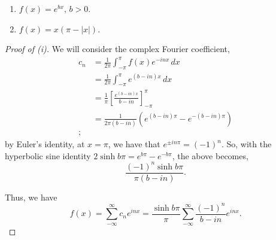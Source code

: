 \documentclass[../hw5]{subfiles}
\begin{document}
\begin{problem}
\begin{enumerate}
	\item $f(x)=e^{bx},\, b>0$.
	\item  $f(x)=x(\pi- |x|)$.
\end{enumerate}
\end{problem}
\begin{proof}[Proof of (i)]
	We will consider the complex Fourier coefficient,
	\begin{align*}
		c_n & = \frac{1}{2\pi }\int_{-\pi }^{\pi } f(x)e^{-inx} \,dx                 \\
		    & = \frac{1}{2\pi }\int_{-\pi }^{\pi } e^{(b-in)x} \,dx                  \\
		    & = \frac{1}{\pi }\left[ \frac{e^{(b-in)x}}{b-in} \right]^{\pi }_{-\pi } \\
		    & = \frac{1}{2\pi(b-in) }\left( e^{(b-in)\pi }-e^{-(b-in)\pi } \right)   \\
		;\end{align*}
	by Euler's identity, at $x=\pi$, we have that $e^{ \pm i n \pi} = (-1)^n$.
	So, with the hyperbolic sine identity $2\sinh{b\pi}=e^{b\pi }-e^{-b\pi } $, the above becomes, \[
		\frac{(-1)^n \sinh{b\pi } }{\pi(b-in) }
		.\]

	Thus, we have \[
		f(x)=\sum_{-\infty}^{\infty} c_n e^{inx} = \frac{ \sinh{b\pi}}{\pi }\sum_{-\infty}^{\infty} \frac{(-1)^n}{b-in}e^{inx}
		.\]
\end{proof}
\end{document}
